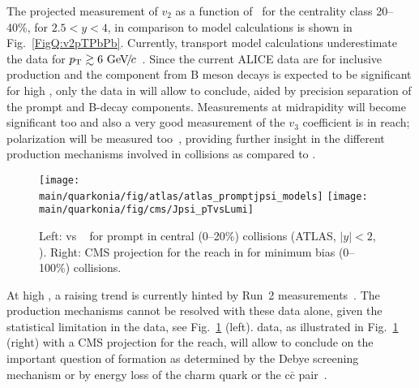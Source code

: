 \documentclass[../report.tex]{subfiles}
\providecommand{\main}{..}
\begin{document}
The projected measurement of \PJgy $v_2$ as a function of \pT\ for the centrality class 20--40\%, for $2.5<y<4$, in comparison to model calculations \cite{Du:2015wha} is shown in Fig.~\ref{FigQ:v2pTPbPb}. Currently, transport model calculations \cite{Zhou:2014kka,Du:2015wha} underestimate the data for $p\sb{\scriptstyle\mathrm{T}}\gtrsim 6~\text{GeV}\!/\mspace{-2mu}c$~\cite{Acharya:2017tgv}. Since the current ALICE data are for inclusive \PJgy production and the component from B meson decays is expected to be significant for high \pT, only the data in \RunsThreeFour will allow to conclude, aided by precision separation of the prompt and B-decay components. Measurements at midrapidity will become significant too and also a very good measurement of the $v_3$ coefficient is in reach; polarization will be measured too~\cite{Abelevetal:2014cna}, providing further insight in the different production mechanisms involved in \PbPb collisions as compared to \pp.

\begin{figure}[h]
\begin{center}
 \texttt{[image: \\main/quarkonia/fig/atlas/atlas\_promptjpsi\_models]}
 \texttt{[image: \\main/quarkonia/fig/cms/Jpsi\_pTvsLumi]}
\end{center}
\caption{Left: \RAA vs \pT~ for prompt \PJgy in central (0--20\%) collisions (ATLAS, $|y|<2$, \cite{Aaboud:2018quy}). Right: CMS projection for the reach in \pT for minimum bias (0--100\%) collisions.
}
\label{FigQ:JpTPbPb}
\end{figure}

At high \pT, a raising trend is currently hinted by Run~2 measurements~\cite{Sirunyan:2017isk,Aaboud:2018quy}. The production mechanisms cannot be resolved with these data alone, given the statistical limitation in the data, see Fig.~\ref{FigQ:JpTPbPb} (left). \RunsThreeFour data, as illustrated in Fig.~\ref{FigQ:JpTPbPb} (right) with a CMS projection for the \pT reach, will allow to conclude on the important question of \PJgy
formation as determined by the Debye screening mechanism \cite{Kopeliovich:2014una,Aronson:2017ymv} or by %
energy loss of the charm quark or the $\text{c}\bar{\text{c}}$ pair~\cite{Spousta:2016agr,Arleo:2017ntr}.

\end{document}
